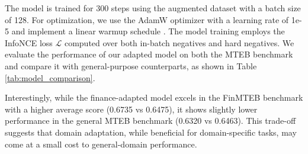 The model is trained for 300 steps using the augmented dataset with a batch size of 128. For optimization, we use the AdamW optimizer with a learning rate of 1e-5 and implement a linear warmup schedule . The model training employs the InfoNCE loss $\mathcal{L}$ computed over both in-batch negatives and hard negatives. We evaluate the performance of our adapted model on both the MTEB benchmark and compare it with general-purpose counterparts, as shown in Table \ref{tab:model_comparison}.

Interestingly, while the finance-adapted model excels in the FinMTEB benchmark with a higher average score (0.6735 vs 0.6475), it shows slightly lower performance in the general MTEB benchmark (0.6320 vs 0.6463). This trade-off suggests that domain adaptation, while beneficial for domain-specific tasks, may come at a small cost to general-domain performance.


